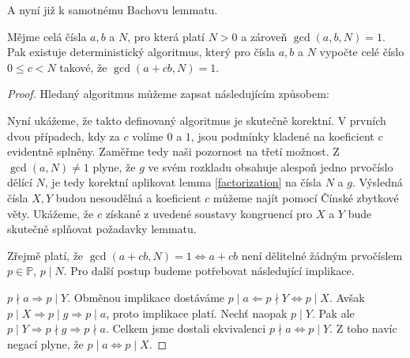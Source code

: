 A nyní již k samotnému Bachovu lemmatu.
\begin{lem} [Bach] \label{bach}
    Mějme celá čísla $ a, b $ a $ N $, pro která platí $ N > 0 $ a zároveň \newline
    $ \gcd(a,b,N) = 1 $. Pak existuje deterministický algoritmus, který pro
    čísla $ a, b $ a $ N $ vypočte celé číslo $ 0 \leq c < N $ takové, že
    $ \gcd(a + cb,N) = 1 $.
\end{lem}
\begin{proof}
Hledaný algoritmus můžeme zapsat následujícím způsobem:\\
    \begin{algorithm}[H] \label{Bach_Algo}
    \end{algorithm}
Nyní ukážeme, že takto definovaný algoritmus je skutečně korektní. V prvních
dvou případech, kdy za $ c $ volíme $ 0 $ a $ 1 $, jsou podmínky
kladené na koeficient $ c $ evidentně splněny. Zaměřme tedy naši pozornost na třetí
možnost. Z $ \gcd(a,N) \neq 1 $ plyne, že $ g $ ve svém rozkladu obsahuje
alespoň jedno prvočíslo dělící $ N $, je tedy korektní aplikovat lemma
\ref{factorization} na čísla $ N $ a $ g $. Výsledná čísla $ X, Y $ budou
nesoudělná a koeficient $ c $ můžeme najít pomocí Čínské zbytkové věty. Ukážeme,
že $ c $ získané z uvedené soustavy kongruencí pro $ X $ a $ Y $ bude skutečně
splňovat požadavky lemmatu.

Zřejmě platí, že $ \gcd(a+cb, N) = 1 \Leftrightarrow a + cb $ není dělitelné žádným
prvočíslem $ p \in \mathbb{P}$, $p \mid N $. Pro další postup budeme potřebovat
následující implikace.

$ p \nmid a \Rightarrow p \mid Y $. Obměnou implikace dostáváme
$ p \mid a \Leftarrow p \nmid Y \Leftrightarrow p \mid X $. Avšak
$ p \mid X \Rightarrow p \mid g \Rightarrow p \mid a $, proto implikace platí.
Nechť naopak $ p \mid Y $. Pak ale
$ p \mid Y \Rightarrow p \nmid g \Rightarrow p \nmid a $. Celkem jsme dostali
ekvivalenci $ p \nmid a \Leftrightarrow p \mid Y $. Z toho navíc negací plyne, že
$ p \mid a \Leftrightarrow p \mid X $.


\end{proof}
